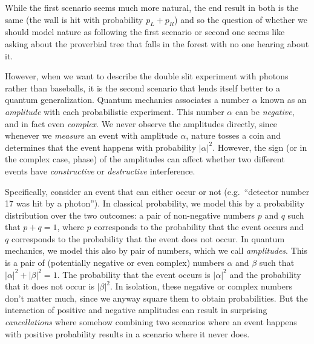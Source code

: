 While the first scenario seems much more natural, the end result in both
is the same (the wall is hit with probability \(p_L+p_R\)) and so the
question of whether we should model nature as following the first
scenario or second one seems like asking about the proverbial tree that
falls in the forest with no one hearing about it.

However, when we want to describe the double slit experiment with
photons rather than baseballs, it is the second scenario that lends
itself better to a quantum generalization. Quantum mechanics associates
a number \(\alpha\) known as an \emph{amplitude} with each probabilistic
experiment. This number \(\alpha\) can be \emph{negative}, and in fact
even \emph{complex}. We never observe the amplitudes directly, since
whenever we \emph{measure} an event with amplitude \(\alpha\), nature
tosses a coin and determines that the event happens with probability
\(|\alpha|^2\). However, the sign (or in the complex case, phase) of the
amplitudes can affect whether two different events have
\emph{constructive} or \emph{destructive} interference.

Specifically, consider an event that can either occur or not
(e.g.~``detector number 17 was hit by a photon''). In classical
probability, we model this by a probability distribution over the two
outcomes: a pair of non-negative numbers \(p\) and \(q\) such that
\(p+q=1\), where \(p\) corresponds to the probability that the event
occurs and \(q\) corresponds to the probability that the event does not
occur. In quantum mechanics, we model this also by pair of numbers,
which we call \emph{amplitudes}. This is a pair of (potentially negative
or even complex) numbers \(\alpha\) and \(\beta\) such that
\(|\alpha|^2 + |\beta|^2 =1\). The probability that the event occurs is
\(|\alpha|^2\) and the probability that it does not occur is
\(|\beta|^2\). In isolation, these negative or complex numbers don't
matter much, since we anyway square them to obtain probabilities. But
the interaction of positive and negative amplitudes can result in
surprising \emph{cancellations} where somehow combining two scenarios
where an event happens with positive probability results in a scenario
where it never does.


